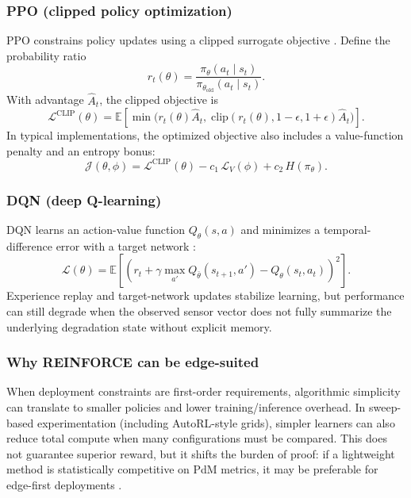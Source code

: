 \documentclass[sn-basic]{sn-jnl} %
\begin{document}
\subsubsection{PPO (clipped policy optimization)}
PPO constrains policy updates using a clipped surrogate objective \cite{Schulman2017}. Define the probability ratio
\begin{equation}
 r_t(\theta)=\frac{\pi_\theta(a_t\mid s_t)}{\pi_{\theta_{\mathrm{old}}}(a_t\mid s_t)}.
\end{equation}
With advantage $\hat{A}_t$, the clipped objective is
\begin{equation}
\mathcal{L}^{\mathrm{CLIP}}(\theta)=\mathbb{E}\left[\min\Big(r_t(\theta)\hat{A}_t,\;\mathrm{clip}(r_t(\theta),1-\epsilon,1+\epsilon)\hat{A}_t\Big)\right].
\end{equation}
In typical implementations, the optimized objective also includes a value-function penalty and an entropy bonus:
\begin{equation}
\mathcal{J}(\theta,\phi)=\mathcal{L}^{\mathrm{CLIP}}(\theta) - c_1\,\mathcal{L}_V(\phi) + c_2\,H(\pi_\theta).
\end{equation}

\subsubsection{DQN (deep Q-learning)}
DQN learns an action-value function $Q_\theta(s,a)$ and minimizes a temporal-difference error with a target network \cite{Mnih2015}:
\begin{equation}
\mathcal{L}(\theta)=\mathbb{E}\left[\left(r_t + \gamma\max_{a'}Q_{\bar\theta}(s_{t+1},a') - Q_\theta(s_t,a_t)\right)^2\right].
\end{equation}
Experience replay and target-network updates stabilize learning, but performance can still degrade when the observed sensor vector does not fully summarize the underlying degradation state without explicit memory.

\subsubsection{Why REINFORCE can be edge-suited}
When deployment constraints are first-order requirements, algorithmic simplicity can translate to smaller policies and lower training/inference overhead. In sweep-based experimentation (including AutoRL-style grids), simpler learners can also reduce total compute when many configurations must be compared. This does not guarantee superior reward, but it shifts the burden of proof: if a lightweight method is statistically competitive on PdM metrics, it may be preferable for edge-first deployments \cite{Schwartz2020, Njor2024}.
\end{document}
